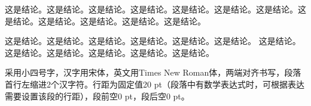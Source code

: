 \begin{conclusion}
这是结论。这是结论。这是结论。这是结论。这是结论。这是结论。这是结论。这是结论。这是结论。这是结论。这是结论。这是结论。

这是结论。这是结论。这是结论。这是结论。这是结论。这是结论。
这是结论。这是结论。这是结论。这是结论。这是结论。这是结论。

采用小四号字，汉字用宋体，英文用Times New Roman体，两端对齐书写，段落首行左缩进2个汉字符。行距为固定值20 pt（段落中有数学表达式时，可根据表达需要设置该段的行距），段前空0 pt，段后空0 pt。

\vspace{2cm}

\end{conclusion}